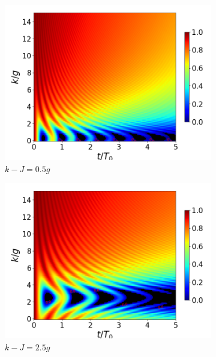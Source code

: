 \begin{figure}[h]
\begin{subfigure}{0.49\textwidth}
        \includegraphics[width=\textwidth]{figuras/ch4/concu/k/eg0+ge0 d=0.0g x=0.5g J=0.0g gamma=0.25g concu k dis.png}
        \caption{$k-J=0.5g$}
        \label{fig4:concu k d1}
    \end{subfigure}
    \hfill
    \begin{subfigure}{0.49\textwidth}
        \includegraphics[width=\textwidth]{figuras/ch4/concu/k/eg0+ge0 d=0.0g x=5.0g J=0.0g gamma=0.25g concu k dis.png}
        \caption{$k-J=2.5g$}
        \label{fig4:concu k d2}
    \end{subfigure}
    \caption{}
    \label{}
\end{figure}
